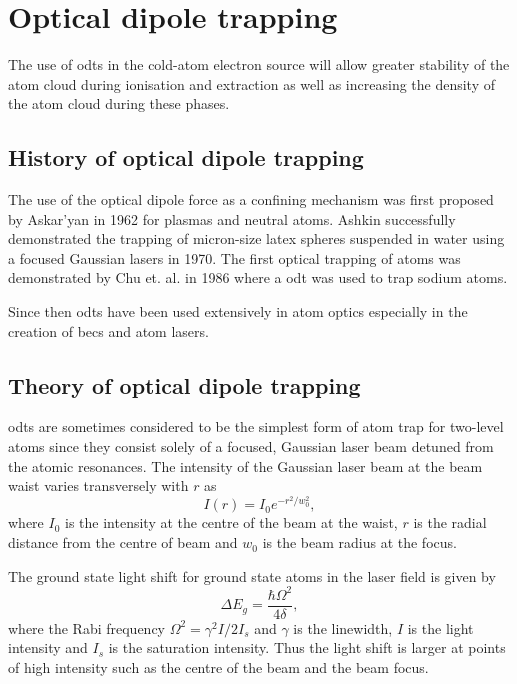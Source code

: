 \chapter{Optical dipole trapping}

The use of \glspl{odt} in the cold-atom electron source will allow greater stability of the atom cloud during ionisation and extraction as well as increasing the density of the atom cloud during these phases.

\section{History of optical dipole trapping}
The use of the optical dipole force as a confining mechanism was first proposed by Askar'yan in 1962\cite{askaryan_effects_1962} for plasmas and neutral atoms. Ashkin successfully demonstrated the trapping of micron-size latex spheres suspended in water using a focused Gaussian lasers in 1970\cite{ashkin_acceleration_1970}. The first optical trapping of atoms was demonstrated by Chu et. al. in 1986\cite{chu_experimental_1986} where a \gls{odt} was used to trap sodium atoms.

Since then \glspl{odt} have been used extensively in atom optics especially in the creation of \glspl{bec} and atom lasers.

\section{Theory of optical dipole trapping}
\Glspl{odt} are sometimes considered to be the simplest form of atom trap for two-level atoms since they consist solely of a focused, Gaussian laser beam detuned from the atomic resonances. The intensity of the Gaussian laser beam at the beam waist varies transversely with $r$ as
\begin{equation}
I(r) = I_0e^{-r^2 / w_0^2},
\end{equation}
where $I_0$ is the intensity at the centre of the beam at the waist, $r$ is the radial distance from the centre of beam and $w_0$ is the beam radius at the focus.

The ground state light shift for ground state atoms in the laser field is given by\cite{metcalf_laser_1999}
\begin{equation}
\Delta E_g = \frac{\hbar \Omega^2}{4\delta},
\end{equation}
where the Rabi frequency $\Omega^2= \gamma^2 I / 2 I_s$ and $\gamma$ is the linewidth, $I$ is the light intensity and $I_s$ is the saturation intensity. Thus the light shift is larger at points of high intensity such as the centre of the beam and the beam focus.

